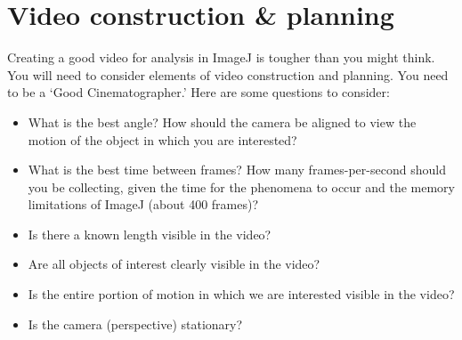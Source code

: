 \section*{Video construction \& planning}
Creating a good video for analysis in ImageJ is tougher than you might think. 
You will need to consider elements of video construction and planning. 
You need to be a ‘Good Cinematographer.’ 
Here are some questions to consider:
\begin{itemize}
\itemsep-0.3em
\item What is the best angle? How should the camera be aligned to view the motion of the object
in which you are interested?
\item What is the best time between frames? How many frames-per-second should you be collecting, given the time for the phenomena to occur and the memory limitations of ImageJ (about 400 frames)?
\item Is there a known length visible in the video?
\item Are all objects of interest clearly visible in the video?
\item Is the entire portion of motion in which we are interested visible in the video?
\item Is the camera (perspective) stationary?
\end{itemize}

